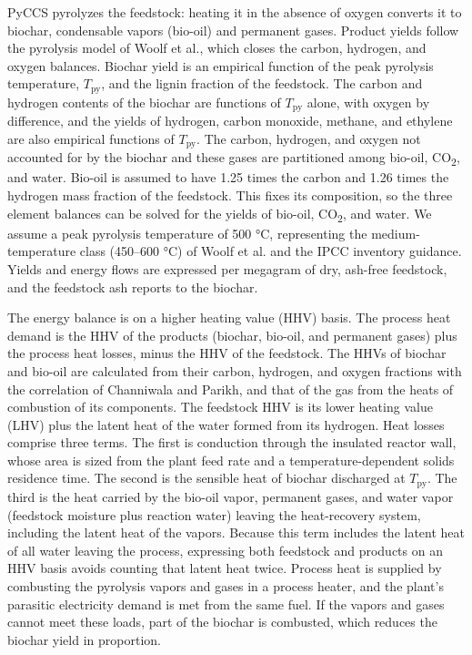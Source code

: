 \documentclass[
  letterpaper,
  twoside,
  twocolumn,
  9pt]{article}
\begin{document}
PyCCS pyrolyzes the feedstock: heating it in the absence of oxygen
converts it to biochar, condensable vapors (bio-oil) and permanent
gases. Product yields follow the pyrolysis model of Woolf et
al.\citep{woolf2014}, which closes the carbon, hydrogen, and oxygen
balances. Biochar yield is an empirical function of the peak pyrolysis
temperature, \(T_{\mathrm{py}}\), and the lignin fraction of the
feedstock. The carbon and hydrogen contents of the biochar are functions
of \(T_{\mathrm{py}}\) alone, with oxygen by difference, and the yields
of hydrogen, carbon monoxide, methane, and ethylene are also empirical
functions of \(T_{\mathrm{py}}\).\citep{woolf2014} The carbon, hydrogen,
and oxygen not accounted for by the biochar and these gases are
partitioned among bio-oil, CO\textsubscript{2}, and water. Bio-oil is
assumed to have 1.25 times the carbon and 1.26 times the hydrogen mass
fraction of the feedstock.\citep{woolf2014} This fixes its composition,
so the three element balances can be solved for the yields of bio-oil,
CO\textsubscript{2}, and water. We assume a peak pyrolysis temperature
of 500 °C, representing the medium-temperature class (450--600 °C) of
Woolf et al.\citep{woolf2021greenhouse} and the IPCC inventory
guidance.\citep{ipcc2019biochar} Yields and energy flows are expressed
per megagram of dry, ash-free feedstock, and the feedstock ash reports
to the biochar.

The energy balance is on a higher heating value (HHV) basis. The process
heat demand is the HHV of the products (biochar, bio-oil, and permanent
gases) plus the process heat losses, minus the HHV of the feedstock. The
HHVs of biochar and bio-oil are calculated from their carbon, hydrogen,
and oxygen fractions with the correlation of Channiwala and
Parikh\citep{channiwala2002}, and that of the gas from the heats of
combustion of its components. The feedstock HHV is its lower heating
value (LHV) plus the latent heat of the water formed from its hydrogen.
Heat losses comprise three terms. The first is conduction through the
insulated reactor wall, whose area is sized from the plant feed rate and
a temperature-dependent solids residence time. The second is the
sensible heat of biochar discharged at \(T_{\mathrm{py}}\). The third is
the heat carried by the bio-oil vapor, permanent gases, and water vapor
(feedstock moisture plus reaction water) leaving the heat-recovery
system, including the latent heat of the vapors. Because this term
includes the latent heat of all water leaving the process, expressing
both feedstock and products on an HHV basis avoids counting that latent
heat twice. Process heat is supplied by combusting the pyrolysis vapors
and gases in a process heater, and the plant's parasitic electricity
demand is met from the same fuel.\citep{woolf2014} If the vapors and
gases cannot meet these loads, part of the biochar is combusted, which
reduces the biochar yield in proportion.
\end{document}
